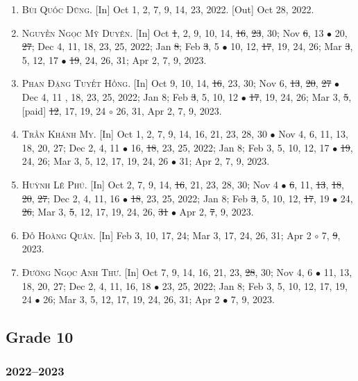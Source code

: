\documentclass{article}
\begin{document}
\begin{enumerate}
	\item \textsc{Bùi Quốc Dũng.} \textsf{[In]} Oct 1, 2, 7, 9, 14, 23, 2022. \textsf{[Out]} Oct 28, 2022.
	\item \textsc{Nguyễn Ngọc Mỹ Duyên.} \textsf{[In]} Oct \st{1}, 2, 9, 10, 14, \st{16}, \st{23}, 30; Nov \st{6}, 13 $\bullet$ 20, \st{27}; Dec 4, 11, 18, 23, 25, 2022; Jan \st{8}; Feb \st{3}, 5 $\bullet$ 10, 12, \st{17}, 19, 24, 26; Mar \st{3}, 5, 12, 17 $\bullet$ \st{19}, 24, 26, 31; Apr 2, 7, 9, 2023.
	\item \textsc{Phan Đặng Tuyết Hồng.} \textsf{[In]} Oct 9, 10, 14, \st{16}, 23, 30; Nov 6, \st{13}, \st{20}, \st{27} $\bullet$ Dec 4, 11 , 18, 23, 25, 2022; Jan 8; Feb \st{3}, 5, 10, 12 $\bullet$ \st{17}, 19, 24, 26; Mar 3, \st{5}, [paid] \st{12}, 17, 19, 24 $\circ$ 26, 31, Apr 2, 7, 9, 2023.
	\item \textsc{Trần Khánh My.} \textsf{[In]} Oct 1, 2, 7, 9, 14, 16, 21, 23, 28, 30 $\bullet$ Nov 4, 6, 11, 13, 18, 20, 27; Dec 2, 4, 11 $\bullet$ 16, \st{18}, 23, 25, 2022; Jan 8; Feb 3, 5, 10, 12, 17 $\bullet$ \st{19}, 24, 26; Mar 3, 5, 12, 17, 19, 24, 26 $\bullet$ 31; Apr 2, 7, 9, 2023.
	\item \textsc{Huỳnh Lê Phú.} \textsf{[In]} Oct 2, 7, 9, 14, \st{16}, 21, 23, 28, 30; Nov 4 $\bullet$ \st{6}, 11, \st{13}, \st{18}, \st{20}, \st{27}; Dec 2, 4, 11, 16 $\bullet$ \st{18}, 23, 25, 2022; Jan 8; Feb \st{3}, 5, 10, 12, \st{17}, 19 $\bullet$ 24, \st{26}; Mar 3, \st{5}, 12, 17, 19, 24, 26, \st{31} $\bullet$ Apr 2, \st{7}, 9, 2023.
	\item \textsc{Đỗ Hoàng Quân.} \textsf{[In]} Feb 3, 10, 17, 24; Mar 3, 17, 24, 26, 31; Apr 2 $\circ$ 7, \st{9}, 2023.
	\item \textsc{Đường Ngọc Anh Thư.} \textsf{[In]} Oct 7, 9, 14, 16, 21, 23, \st{28}, 30; Nov 4, 6 $\bullet$ 11, 13, 18, 20, 27; Dec 2, 4, 11, 16, 18 $\bullet$ 23, 25, 2022; Jan 8; Feb 3, 5, 10, 12, 17, 19, 24 $\bullet$ 26; Mar 3, 5, 12, 17, 19, 24, 26, 31; Apr 2 $\bullet$ 7, 9, 2023.
\end{enumerate}

\subsection{Grade 10}

\subsubsection{2022--2023}
\end{document}
